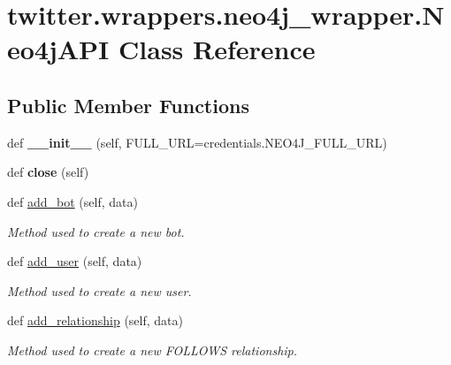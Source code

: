 \hypertarget{classtwitter_1_1wrappers_1_1neo4j__wrapper_1_1Neo4jAPI}{}\section{twitter.\+wrappers.\+neo4j\+\_\+wrapper.\+Neo4j\+A\+PI Class Reference}
\label{classtwitter_1_1wrappers_1_1neo4j__wrapper_1_1Neo4jAPI}
\subsection*{Public Member Functions}
\begin{DoxyCompactItemize}
\item 
\mbox{\label{classtwitter_1_1wrappers_1_1neo4j__wrapper_1_1Neo4jAPI_a38ea3ba22911e158c867c1e15829ca46}} 
def {\bfseries \+\_\+\+\_\+init\+\_\+\+\_\+} (self, F\+U\+L\+L\+\_\+\+U\+RL=credentials.\+N\+E\+O4\+J\+\_\+\+F\+U\+L\+L\+\_\+\+U\+RL)
\item 
\mbox{\label{classtwitter_1_1wrappers_1_1neo4j__wrapper_1_1Neo4jAPI_ace5969c9108654dd33bde37ef32ac08f}} 
def {\bfseries close} (self)
\item 
def \hyperlink{classtwitter_1_1wrappers_1_1neo4j__wrapper_1_1Neo4jAPI_a188c0f42742ff0ae94017a161e6c2633}{add\+\_\+bot} (self, data)
\begin{DoxyCompactList}\small\item\em Method used to create a new bot. \end{DoxyCompactList}\item 
def \hyperlink{classtwitter_1_1wrappers_1_1neo4j__wrapper_1_1Neo4jAPI_ad165965732c986fd93cbd0dd8dd23ccc}{add\+\_\+user} (self, data)
\begin{DoxyCompactList}\small\item\em Method used to create a new user. \end{DoxyCompactList}\item 
def \hyperlink{classtwitter_1_1wrappers_1_1neo4j__wrapper_1_1Neo4jAPI_a754d17ed04106caedac79a38d0b6d6e6}{add\+\_\+relationship} (self, data)
\begin{DoxyCompactList}\small\item\em Method used to create a new F\+O\+L\+L\+O\+WS relationship. \end{DoxyCompactList}\item 

\end{DoxyCompactItemize}
